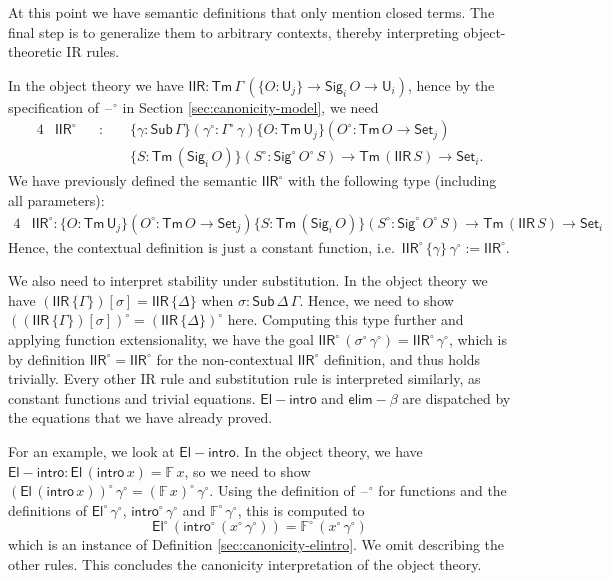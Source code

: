 \documentclass[acmsmall,screen,review]{acmart}
\newcommand{\msf}[1]{{\mathsf{#1}}}
\newcommand{\mbb}[1]{\mathbb{#1}}
\newcommand{\U}{\msf{U}}
\newcommand{\Set}{\msf{Set}}
\newcommand{\El}{\msf{El}}
\newcommand{\Sig}{\msf{Sig}}
\newcommand{\blank}{{\mathord{\hspace{1pt}\text{--}\hspace{1pt}}}}
\newcommand{\intro}{\msf{intro}}
\newcommand{\elim}{\msf{elim}}
\newcommand{\IIR}{\msf{IIR}}
\newcommand{\Sub}{\msf{Sub}}
\newcommand{\Tm}{\msf{Tm}}
\newcommand{\w}{\circ}
\newcommand{\Elintro}{\msf{El\!\!-\!\!intro}}
\newcommand{\elimbeta}{\elim\!-\!\!\beta}
\newcommand{\F}{\mbb{F}}
\begin{document}
\begin{definition}
At this point we have semantic definitions that only mention closed terms. The final step is to
generalize them to arbitrary contexts, thereby interpreting object-theoretic IR rules.

In the object theory we have $\IIR : \Tm\,\Gamma\,(\{O : \U_j\} \to \Sig_i\,O \to \U_i)$, hence by the specification
of $\blank^\w$ in Section \ref{sec:canonicity-model}, we need
\begin{alignat*}{4}
  & \IIR^\w &&:\,\,&& \{\gamma : \Sub\,\Gamma\}(\gamma^\w : \Gamma^\w\,\gamma)\{O : \Tm\,\U_j\}(O^\w : \Tm\,O \to \Set_j)\\
  &         &&     && \{S : \Tm\,(\Sig_i\,O)\}(S^\w : \Sig^\w\,O^\w\,S) \to \Tm\,(\IIR\,S) \to \Set_i.
\end{alignat*}
We have previously defined the semantic $\IIR^\w$ with the following type (including all parameters):
\begin{alignat*}{4}
  & \IIR^\w : \{O : \Tm\,\U_j\}(O^\w : \Tm\,O \to \Set_j)\{S : \Tm\,(\Sig_i\,O)\}(S^\w : \Sig^\w\,O^\w\,S) \to \Tm\,(\IIR\,S) \to \Set_i
\end{alignat*}
Hence, the contextual definition is just a constant function, i.e.\ $\IIR^\w\,\{\gamma\}\,\gamma^\w
:= \IIR^\w$.

We also need to interpret stability under substitution. In the object theory we have
$(\IIR\,\{\Gamma\})[\sigma] = \IIR\,\{\Delta\}$ when $\sigma : \Sub\,\Delta\,\Gamma$. Hence, we need
to show $((\IIR\,\{\Gamma\})[\sigma])^\w = (\IIR\,\{\Delta\})^\w$ here. Computing this type further
and applying function extensionality, we have the goal $\IIR^\w\,(\sigma^\w\,\gamma^\w) =
\IIR^\w\,\gamma^\w$, which is by definition $\IIR^\w = \IIR^\w$ for the non-contextual $\IIR^\w$
definition, and thus holds trivially. Every other IR rule and substitution rule is interpreted
similarly, as constant functions and trivial equations. $\Elintro$ and $\elimbeta$ are dispatched by
the equations that we have already proved.

For an example, we look at $\Elintro$. In the object theory, we have $\Elintro : \El\,(\intro\,x) =
\F\,x$, so we need to show $(\El\,(\intro\,x))^\w\,\gamma^\w = (\F\,x)^\w\,\gamma^\w$. Using the
definition of $\blank^\w$ for functions and the definitions of $\El^\w\,\gamma^\w$,
$\intro^\w\,\gamma^\w$ and $\F^\w\,\gamma^\w$, this is computed to
\[ \El^\w\,(\intro^\w\,(x^\w\,\gamma^\w)) = \F^\w\,(x^\w\,\gamma^\w) \]
which is an instance of Definition \ref{sec:canonicity-elintro}. We omit describing the other
rules. This concludes the canonicity interpretation of the object theory.
\end{definition}
\end{document}
